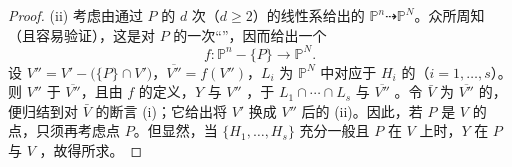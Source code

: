 \begin{proof}
(ii) 考虑由通过 $P$ 的 $d$ 次（$d\geq2$）的线性系给出的 $\mathbb P^n\dashrightarrow\mathbb P^N$。众所周知（且容易验证），这是对 $P$ 的一次“”，因而给出一个
\[
 f:\mathbb P^n-\{P\}\longrightarrow\mathbb P^N.
\]
设 $V''=V'-\bigl(\{P\}\cap V'\bigr)$，$\overline{V''}=f(V'')$，$L_i$ 为 $\mathbb P^N$ 中对应于 $H_i$ 的（$i=1,\ldots,s$）。则 $V''$ 于 $\overline{V''}$，且由 $f$ 的定义，$Y$ 与 $V''$ ，于 $L_1\cap\cdots\cap L_s$ 与 $\overline{V''}$ 。令 $\bar V$ 为 $\overline{V''}$ 的，便归结到对 $\bar V$ 的断言 (i)；它给出将 $V'$ 换成 $V''$ 后的 (ii)。因此，若 $P$ 是 $V$ 的点，只须再考虑点 $P$。但显然，当 $\{H_1,\ldots,H_s\}$ 充分一般且 $P$ 在 $V$ 上时，$Y$ 在 $P$ 与 $V$ ，故得所求。
\end{proof}

